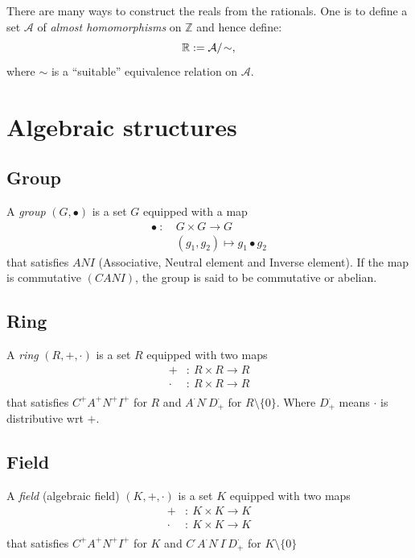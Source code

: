 \documentclass[root.tex]{subfiles}
\begin{document}
There are many ways to construct the reals from the rationals. One is to define a set $\mathcal{A}$ of \emph{almost homomorphisms} on $\mathbb{Z}$ and hence define:
$$
\mathbb{R}\index{$\mathbb{R}$} := \mathcal{A}/\!\sim,
$$
where $\sim$ is a ``suitable'' equivalence relation on $\mathcal{A}$.



\chapter{Algebraic structures}%
\section{Group}
\begin{mydef}
  A \emph{group} $(G,\bullet)$ is a set $G$ equipped with a map
  \begin{align*}
    \bullet\ :\ &G \times G \rightarrow G\\
                &(g_1, g_2) \mapsto g_1 \bullet g_2
  \end{align*}
  that satisfies $ANI$ (Associative, Neutral element and Inverse element). If the map is commutative $(CANI)$, the group is said to be commutative or abelian.
\end{mydef}
\section{Ring}
\begin{mydef}
  A \emph{ring} $(R, +, \cdot )$ is a set $R$ equipped with two maps
  \begin{align*}
    +      &:\ R \times R \rightarrow R\\
    \cdot\ &:\ R \times R \rightarrow R\\
  \end{align*}
  that satisfies $C^{+}A^{+}N^{+}I^{+}$ for $R$ and $A^{\cdot}N^{\cdot}D^{\cdot}_{+}$  for $R\setminus \{0\}$. Where $D^{\cdot}_+$ means $\cdot$ is distributive wrt $+$.
\end{mydef}

\section{Field}
\begin{mydef}
  A \emph{field} (algebraic field) $(K, +, \cdot )$ is a set $K$ equipped with two maps
  \begin{align*}
    +      &:\ K \times K \rightarrow K\\
    \cdot\ &:\ K \times K \rightarrow K\\
  \end{align*}
  that satisfies $C^{+}A^{+}N^{+}I^{+}$ for $K$ and $C^{\cdot}A^{\cdot}N^{\cdot}I^{\cdot}D^{\cdot}_{+}$ for $K\setminus \{0\}$ 
\end{mydef}
\end{document}
